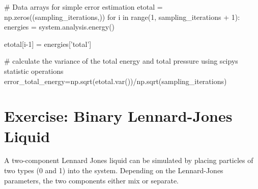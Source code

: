 \documentclass[
paper=a4,                       %
fontsize=11pt,                  %
twoside,                        %
footsepline,                    %
headsepline,                    %
headinclude=false,              %
footinclude=false,              %
pagesize,                       %
]{scrartcl}
\begin{document}
\begin{pypresso}
# Data arrays for simple error estimation
etotal = np.zeros((sampling_iterations,))
for i in range(1, sampling_iterations + 1):
    energies = system.analysis.energy()

    etotal[i-1] = energies['total']

# calculate the variance of the total energy and total pressure using scipys statistic operations
error_total_energy=np.sqrt(etotal.var())/np.sqrt(sampling_iterations)
\end{pypresso}

\newpage
\section{Exercise: Binary Lennard-Jones Liquid}

%
A two-component Lennard Jones liquid can be simulated by placing particles of two types (0 and 1) into the system. 
Depending on the Lennard-Jones parameters, the two components either mix or separate.
\end{document}

